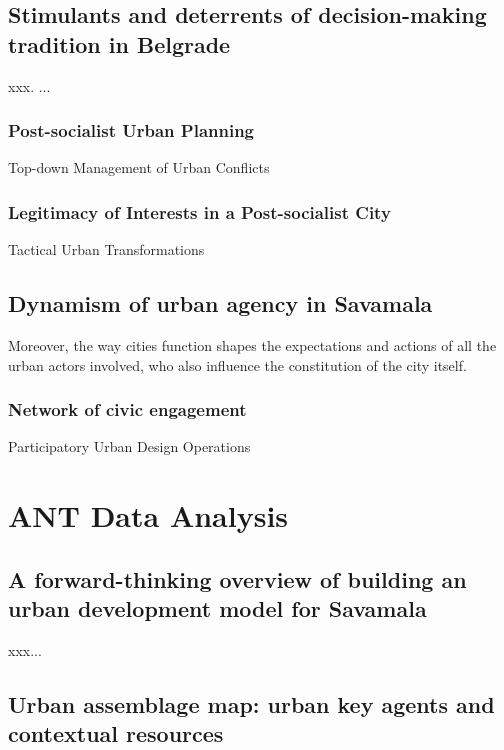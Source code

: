 \documentclass[11pt]{report}
\begin{document}
\section{Stimulants and deterrents of decision-making tradition in Belgrade}

xxx. ...

\subsection{Post-socialist Urban Planning}

Top-down Management of Urban Conflicts

\subsection{Legitimacy of Interests in a Post-socialist City}

Tactical Urban Transformations 

\section{Dynamism of urban agency in Savamala}

Moreover, the way cities function shapes the expectations and actions of all the urban actors involved, who also influence the constitution of the city itself. 

\subsection{Network of civic engagement}

Participatory Urban Design Operations



\chapter{ANT Data Analysis}

\section{A forward-thinking overview of building an urban development model for Savamala}

xxx...

\section{Urban assemblage map: urban key agents and contextual resources}
\end{document}
